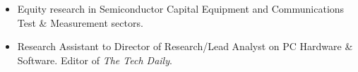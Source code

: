 \documentclass[a4paper,10pt]{memoir} %
\begin{document}


\begin{itemize}
	\item Equity research in Semiconductor Capital Equipment and 
	Communications Test \& Measurement sectors.
\end{itemize}
\Sep %

\begin{itemize}
	\item Research Assistant to Director of Research/Lead Analyst on PC 
	Hardware \& Software. Editor of \textit{The Tech Daily}.
\end{itemize}

\Sep %



	




\end{document}
